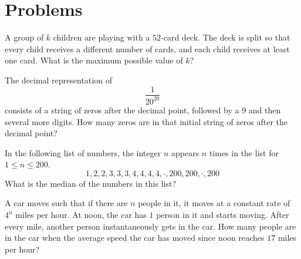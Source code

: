 \documentclass[mast]{lucky}
\begin{document}
\pagebreak

\section{Problems}

\minpt{}

\psetquote{}{}

\begin{prob}[CMC 10B 2020/4]{2}
A group of $k$ children are playing with a $52$-card deck.  The deck is split so that every child receives a different number of cards, and each child receives at least one card. What is the maximum possible value of $k$?
\end{prob}

\begin{req}[AMC 10B 2020/12]{3}
The decimal representation of \[\frac{1}{20^{20}}\] consists of a string of zeros after the decimal point, followed by a $9$ and then several more digits. How many zeros are in that initial string of zeros after the decimal point?

\end{req}

\begin{prob}[AMC 10A 2021/16]{4}
In the following list of numbers, the integer $n$ appears $n$ times in the list for $1 \leq n \leq 200$.
$$1, 2, 2, 3, 3, 3, 4, 4, 4, 4, \cdot, 200, 200, \cdot , 200$$What is the median of the numbers in this list?

\end{prob}

\begin{prob}[DMC 10C 2021/19]{6}
    A car moves such that if there are $n$ people in it, it moves at a constant rate of $4^n$ miles per hour. At noon, the car has $1$ person in it and starts moving. After every mile, another person instantaneously gets in the car. How many people are in the car when the average speed the car has moved since noon reaches $17$ miles per hour?
\end{prob}
\end{document}
